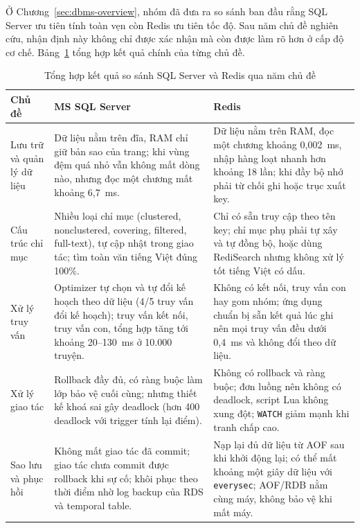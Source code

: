 Ở Chương~\ref{sec:dbms-overview}, nhóm đã đưa ra so sánh ban đầu rằng SQL Server ưu tiên tính toàn vẹn còn Redis ưu tiên tốc độ. Sau năm chủ đề nghiên cứu, nhận định này không chỉ được xác nhận mà còn được làm rõ hơn ở cấp độ cơ chế. Bảng~\ref{tab:conclusion-compare} tổng hợp kết quả chính của từng chủ đề.

\begin{table}[H]
\centering
\small
\renewcommand{\arraystretch}{1.3}
\begin{tabularx}{\textwidth}{|>{\raggedright\arraybackslash}p{2.6cm}|>{\raggedright\arraybackslash}X|>{\raggedright\arraybackslash}X|}
\hline
\textbf{Chủ đề} & \textbf{MS SQL Server} & \textbf{Redis} \\ \hline
Lưu trữ và quản lý dữ liệu & Dữ liệu nằm trên đĩa, RAM chỉ giữ bản sao của trang; khi vùng đệm quá nhỏ vẫn không mất dòng nào, nhưng đọc một chương mất khoảng 6,7~ms. & Dữ liệu nằm trên RAM, đọc một chương khoảng 0,002~ms, nhập hàng loạt nhanh hơn khoảng 18 lần; khi đầy bộ nhớ phải từ chối ghi hoặc trục xuất key. \\ \hline
Cấu trúc chỉ mục & Nhiều loại chỉ mục (clustered, nonclustered, covering, filtered, full-text), tự cập nhật trong giao tác; tìm toàn văn tiếng Việt đúng 100\%. & Chỉ có sẵn truy cập theo tên key; chỉ mục phụ phải tự xây và tự đồng bộ, hoặc dùng RediSearch nhưng không xử lý tốt tiếng Việt có dấu. \\ \hline
Xử lý truy vấn & Optimizer tự chọn và tự đổi kế hoạch theo dữ liệu (4/5 truy vấn đổi kế hoạch); truy vấn kết nối, truy vấn con, tổng hợp tăng tới khoảng 20--130~ms ở 10.000 truyện. & Không có kết nối, truy vấn con hay gom nhóm; ứng dụng chuẩn bị sẵn kết quả lúc ghi nên mọi truy vấn đều dưới 0,4~ms và không đổi theo dữ liệu. \\ \hline
Xử lý giao tác & Rollback đầy đủ, có ràng buộc làm lớp bảo vệ cuối cùng; nhưng thiết kế khoá sai gây deadlock (hơn 400 deadlock với trigger tính lại điểm). & Không có rollback và ràng buộc; đơn luồng nên không có deadlock, script Lua không xung đột; \texttt{WATCH} giảm mạnh khi tranh chấp cao. \\ \hline
Sao lưu và phục hồi & Không mất giao tác đã commit; giao tác chưa commit được rollback khi sự cố; khôi phục theo thời điểm nhờ log backup của RDS và temporal table. & Nạp lại đủ dữ liệu từ AOF sau khi khởi động lại; có thể mất khoảng một giây dữ liệu với \texttt{everysec}; AOF/RDB nằm cùng máy, không bảo vệ khi mất máy. \\ \hline
\end{tabularx}
\caption{Tổng hợp kết quả so sánh SQL Server và Redis qua năm chủ đề}
\label{tab:conclusion-compare}
\end{table}


